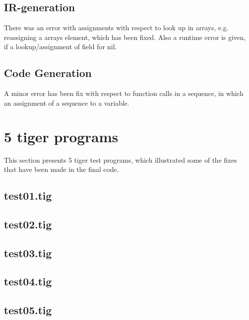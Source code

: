 \documentclass{article}
\begin{document}
\subsection{IR-generation}
There was an error with assignments with respect to look up in arrays, e.g. reassigning a arrays element, which has been fixed. Also a runtime error is given, if a lookup/assignment of field for nil. 

\subsection{Code Generation}
A minor error has been fix with respect to function calls in a sequence, in which an assignment of a sequence to a variable. 

\section{5 tiger programs}
This section presents 5 tiger test programs, which illustrated some of the fixes that have been made in the final code.

\subsection{test01.tig}



\subsection{test02.tig}



\subsection{test03.tig}



\subsection{test04.tig}



\subsection{test05.tig}
\end{document}
